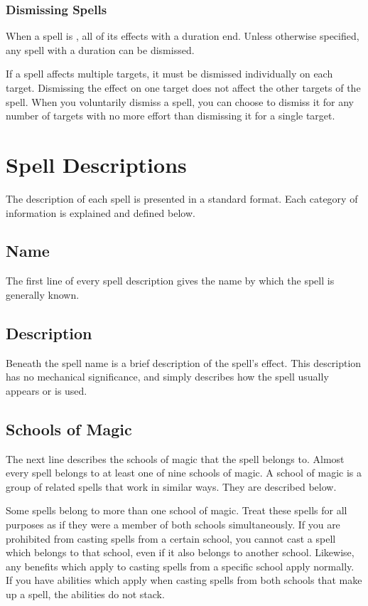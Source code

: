         \subsubsection{Dismissing Spells}\label{Dismissing Spells}
            When a spell is , all of its effects with a duration end.
            Unless otherwise specified, any spell with a duration can be dismissed.

            If a spell affects multiple targets, it must be dismissed individually on each target.
            Dismissing the effect on one target does not affect the other targets of the spell.
            When you voluntarily dismiss a spell, you can choose to dismiss it for any number of targets with no more effort than dismissing it for a single target.

\section{Spell Descriptions}
    The description of each spell is presented in a standard format.
    Each category of information is explained and defined below.

    \subsection{Name}
        The first line of every spell description gives the name by which the spell is generally known.

    \subsection{Description}
        Beneath the spell name is a brief description of the spell's effect.
        This description has no mechanical significance, and simply describes how the spell usually appears or is used.

    \subsection{Schools of Magic}\label{Schools of Magic}
        The next line describes the schools of magic that the spell belongs to.
        Almost every spell belongs to at least one of nine schools of magic.
        A school of magic is a group of related spells that work in similar ways.
        They are described below.

        Some spells belong to more than one school of magic.
        Treat these spells for all purposes as if they were a member of both schools simultaneously.
        If you are prohibited from casting spells from a certain school, you cannot cast a spell which belongs to that school, even if it also belongs to another school.
        Likewise, any benefits which apply to casting spells from a specific school apply normally.
        If you have abilities which apply when casting spells from both schools that make up a spell, the abilities do not stack.

